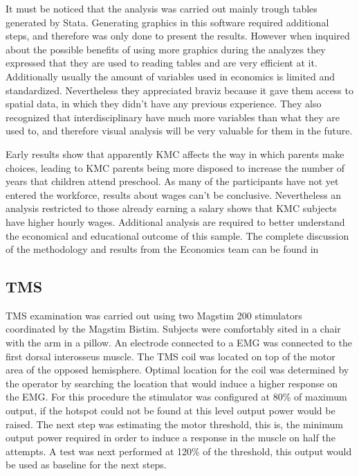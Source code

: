 It must be noticed that the analysis was carried out mainly trough tables generated by Stata. Generating graphics in this software required additional steps, and therefore was only done to present the results. However when inquired about the possible benefits of using more graphics during the analyzes they expressed that they are used to reading tables and are very efficient at it. Additionally usually the amount of variables used in economics is limited and standardized. Nevertheless they appreciated braviz because it gave them access to spatial data, in which they didn't have any previous experience. They also recognized that interdisciplinary have much more variables than what they are used to, and therefore visual analysis will be very valuable for them in the future.

Early results show that apparently KMC affects the way in which parents make choices, leading to KMC parents being more disposed to increase the number of years that children attend preschool. As many of the participants have not yet entered the workforce, results about wages can't be conclusive. Nevertheless an analysis restricted to those already earning a salary shows that KMC subjects have higher hourly wages. Additional analysis are required to better understand the economical and educational outcome of this sample.  The complete discussion of the methodology and results from the Economics team can be found in \autocite{?}
\subsection{TMS}

TMS examination was carried out using two Magstim 200 stimulators coordinated by the Magstim Bistim. Subjects were comfortably sited in a chair with the arm in a pillow. An electrode connected to a EMG was connected to the first dorsal interosseus muscle. The TMS coil was located on top of the motor area of the opposed hemisphere. Optimal location for the coil was determined by the operator by searching the location that would induce a higher response on the EMG. For this procedure the stimulator was configured at 80\% of maximum output, if the hotspot could not be found at this level output power would be raised. The next step was estimating the motor threshold, this is, the minimum output power required in order to induce a response in the muscle on half the attempts. A test was next performed at 120\% of the threshold, this output would be used as baseline for the next steps.

